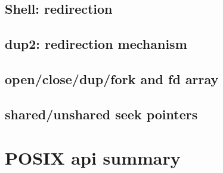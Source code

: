 

\subsection{Shell: redirection}




\subsection{dup2: redirection mechanism}



\subsection{open/close/dup/fork and fd array}


\subsection{shared/unshared seek pointers}


\section{POSIX api summary}

